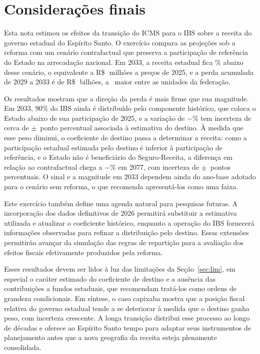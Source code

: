 \documentclass[12pt,a4paper]{article}
\newcommand{\Rs}{R\$\,}
\begin{document}
\section{Considerações finais}\label{sec:final}

Esta nota estimou os efeitos da transição do ICMS para o IBS sobre a receita do governo estadual do Espírito Santo. O exercício compara as projeções sob a reforma com um cenário contrafactual que preserva a participação de referência do Estado na arrecadação nacional. Em 2033, a receita estadual fica \NumVarFinalUma\% abaixo desse cenário, o equivalente a \Rs\NumDifMiCinco\ milhões a preços de 2025, e a perda acumulada de 2029 a 2033 é de \Rs\NumDifAcum\ bilhões, a \NumRank\textordfeminine\ maior entre as unidades da federação.

Os resultados mostram que a direção da perda é mais firme que sua magnitude. Em 2033, 90\% do IBS ainda é distribuído pelo componente histórico, que coloca o Estado abaixo de sua participação de 2025, e a variação de $-$\NumVarFinalUma\% tem incerteza de cerca de $\pm$\NumDestTrintaTres\ ponto percentual associada à estimativa do destino. À medida que esse peso diminui, o coeficiente de destino passa a determinar a receita: como a participação estadual estimada pelo destino é inferior à participação de referência, e o Estado não é beneficiário do Seguro-Receita, a diferença em relação ao contrafactual chega a $-$\NumVarSetentaSete\% em 2077, com incerteza de $\pm$\NumDestSetentaSete\ pontos percentuais. O sinal e a magnitude em 2033 dependem ainda do ano-base adotado para o cenário sem reforma, o que recomenda apresentá-los como uma faixa.

Este exercício também define uma agenda natural para pesquisas futuras. A incorporação dos dados definitivos de 2026 permitirá substituir a estimativa utilizada e atualizar o coeficiente histórico, enquanto a operação do IBS fornecerá informações observadas para refinar a distribuição pelo destino. Essas extensões permitirão avançar da simulação das regras de repartição para a avaliação dos efeitos fiscais efetivamente produzidos pela reforma.

Esses resultados devem ser lidos à luz das limitações da Seção~\ref{sec:lim}, em especial o caráter estimado do coeficiente de destino e a ausência das contribuições a fundos estaduais, que recomendam tratá-los como ordens de grandeza condicionais. Em síntese, o caso capixaba mostra que a posição fiscal relativa do governo estadual tende a se deteriorar à medida que o destino ganha peso, com incerteza crescente. A longa transição distribui esse processo ao longo de décadas e oferece ao Espírito Santo tempo para adaptar seus instrumentos de planejamento antes que a nova geografia da receita esteja plenamente consolidada.
\end{document}
